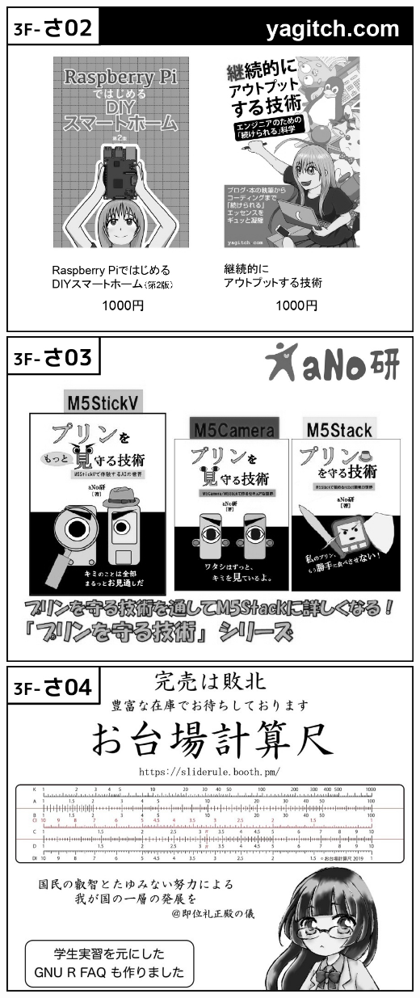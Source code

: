 \begin{center}
\includegraphics[width=0.9\linewidth]{images/circle-appeals/3F-さ02.jpg}
\includegraphics[width=0.9\linewidth]{images/circle-appeals/3F-さ03.jpg}
\includegraphics[width=0.9\linewidth]{images/circle-appeals/3F-さ04.jpg}

\end{center}
